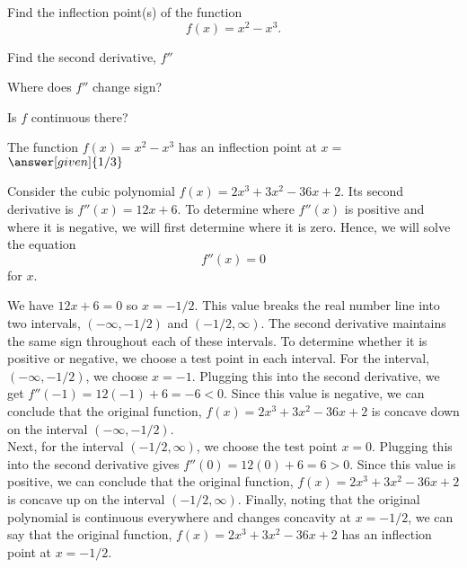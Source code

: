 \documentclass{ximera}
\begin{document}
\begin{problem} %
  Find the inflection point(s) of the function
  \[
     f(x) = x^2 - x^3.
  \]
  
    \begin{hint}
      Find the second derivative, $f''$
    \end{hint}
    \begin{hint}
      Where does $f''$ change sign?
    \end{hint}
    \begin{hint}
      Is $f$ continuous there?
    \end{hint}    
		The function $f(x) = x^2 - x^3$ has an inflection point at $x =$
		 $\answer[given]{1/3}$
		
\end{problem}


\begin{example} %
Consider the cubic polynomial $f(x) = 2x^3 + 3x^2 - 36x +2$.  Its second derivative is 
$f''(x) = 12x + 6$.  To determine where $f''(x)$ is positive and where it is negative, 
we will first determine where it is zero. Hence, we will solve the equation
\[f''(x) = 0\]
for $x$.

We have $12x + 6 = 0$ so $x = -1/2$.
This value breaks the real number line into two intervals, $(-\infty, -1/2)$ and $(-1/2, \infty)$.
The second derivative maintains the same sign throughout each of these intervals.  
To determine whether it is positive or negative, we choose a test point in each interval.
For the interval, $(-\infty, -1/2)$, we choose $x = -1$.  Plugging this into the second derivative, we get
$f''(-1) = 12(-1) + 6 = -6 < 0$.  Since this value is negative, we can conclude that the original function,
$f(x) = 2x^3 + 3x^2 - 36x + 2$ is concave down on the interval $(-\infty, -1/2)$. \\

Next, for the interval $(-1/2, \infty)$, we choose the test point 
$x = 0$.  Plugging this into the second derivative gives $f''(0) = 12(0) + 6 = 6 > 0$.
Since this value is positive, we can conclude that the original function,
$f(x) = 2x^3 + 3x^2 - 36x + 2$ is concave up on the interval $(-1/2, \infty)$.
Finally, noting that the original polynomial is continuous everywhere and changes concavity at $x = -1/2$, we can say that
the original function, 
$f(x) = 2x^3 + 3x^2 - 36x + 2$ has an inflection point at $x = -1/2$.
\end{example}
\end{document}
